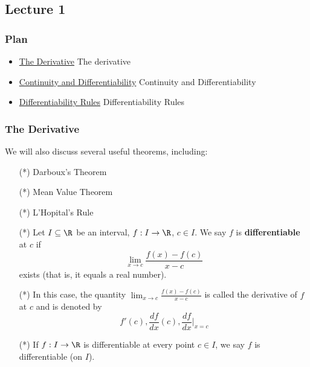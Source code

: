 \subsection{Lecture 1}

\subsubsection{Plan}

\begin{itemize}
    \item {\hyperref[The Derivative]{The Derivative}} The derivative
    \item {\hyperref[Continuity and Differentiability]{Continuity and Differentiability}} Continuity and Differentiability
    \item {\hyperref[Differentiability Rules]{Differentiability Rules}} Differentiability Rules
\end{itemize}

\subsubsection{The Derivative}\label{The Derivative}

We will also discuss several useful theorems, including: 

\begin{enumerate}
    \item[(*)] Darboux's Theorem
    \item[(*)] Mean Value Theorem
    \item[(*)] L'Hopital's Rule
\end{enumerate}

\begin{definition}[Differentiability]
    \begin{enumerate}
        \item[(*)] Let \( I \subseteq  \R  \) be an interval, \( f: I \to \R  \), \( c \in I  \). We say \( f  \) is \textbf{differentiable} at \( c  \) if 
    \[  \lim_{ x \to c }  \frac{ f(x) -f(c) }{ x - c  } \]
    exists (that is, it equals a real number).
    \item[(*)] In this case, the quantity \( \lim_{ x \to c }  \frac{ f(x) - f(c) }{ x - c  }  \) is called the derivative of \( f  \) at \( c  \) and is denoted by
        \[  f'(c), \frac{ df }{ dx }(c), \frac{ df }{ dx } \Bigg|_{x = c} \]
    \item[(*)] If \( f: I \to \R  \) is differentiable at every point \( c \in I  \), we say \( f \) is differentiable (on \( I  \)).
    \end{enumerate}
\end{definition}


